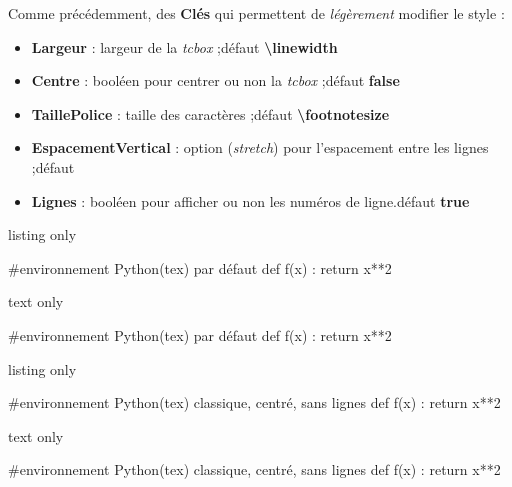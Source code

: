 \documentclass[a4paper,french,11pt]{article}
\newcommand\Cle[1]{{\bfseries\sffamily\textlangle #1\textrangle}}
\begin{document}
\begin{cautionblock}
Comme précédemment, des \Cle{Clés} qui permettent de \textit{légèrement} modifier le style :

\begin{itemize}
	\item \Cle{Largeur} : largeur de la \textit{tcbox} ;\hfill{}défaut \Cle{\textbackslash linewidth}
	\item \Cle{Centre} : booléen pour centrer ou non la \textit{tcbox} ;\hfill{}défaut \Cle{false}
	\item \Cle{TaillePolice} : taille des caractères ;\hfill{}défaut \Cle{\textbackslash footnotesize}
	\item \Cle{EspacementVertical} : option (\textit{stretch}) pour l'espacement entre les lignes ;\hfill{}défaut \Cle{1}
	\item \Cle{Lignes} : booléen pour afficher ou non les numéros de ligne.\hfill{}défaut \Cle{true}
\end{itemize}
\vspace*{-\baselineskip}\leavevmode
\end{cautionblock}

\begin{PresCodeTexPL}{listing only}
\begin{CodePythontex}{} %
	#environnement Python(tex) par défaut
	def f(x) :
		return x**2
\end{CodePythontex}
\end{PresCodeTexPL}

\begin{PresCodeSortiePL}{text only}
\begin{CodePythontex}{}
	#environnement Python(tex) par défaut
	def f(x) :
		return x**2
\end{CodePythontex}
\end{PresCodeSortiePL}

\begin{PresCodeTexPL}{listing only}
\begin{CodePythontexAlt}[Largeur=12cm,Centre,Lignes=false]{}
	#environnement Python(tex) classique, centré, sans lignes
	def f(x) :
		return x**2
\end{CodePythontexAlt}
\end{PresCodeTexPL}

\begin{PresCodeSortiePL}{text only}
\begin{CodePythontexAlt}[Largeur=12cm,Centre,Lignes=false]{}
	#environnement Python(tex) classique, centré, sans lignes
	def f(x) :
		return x**2
\end{CodePythontexAlt}
\end{PresCodeSortiePL}
\end{document}
